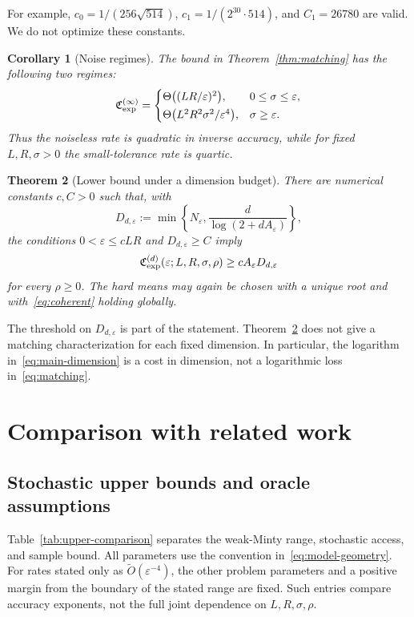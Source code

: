 \documentclass[11pt,a4paper]{article}
\newcommand{\eps}{\varepsilon}
\newcommand{\Cexp}{\mathfrak C_{\rm exp}}
\newtheorem{theorem}{Theorem}[section]
\newtheorem{corollary}[theorem]{Corollary}
\theoremstyle{definition}
\theoremstyle{remark}
\begin{document}
For example, $c_0=1/(256\sqrt{514})$, $c_1=1/(2^{30}\cdot514)$,
and $C_1=26780$ are valid. We do not optimize these constants.

\begin{corollary}[Noise regimes]\label{cor:exponent}
The bound in Theorem~\ref{thm:matching} has the following two regimes:
\[
\Cexp^{(\infty)}=
\begin{cases}
 \Theta\big((LR/\eps)^2\big),&0\le\sigma\le\eps,\\[2pt]
 \Theta\big(L^2R^2\sigma^2/\eps^4\big),&\sigma\ge\eps.
\end{cases}
\]
Thus the noiseless rate is quadratic in inverse accuracy, while for fixed
$L,R,\sigma>0$ the small-tolerance rate is quartic.
\end{corollary}

\begin{theorem}[Lower bound under a dimension budget]\label{thm:dimension}
There are numerical constants $c,C>0$ such that, with
\begin{equation}\label{eq:dimension-scale}
 D_{d,\eps}:=\min\left\{N_\eps,
                 \frac{d}{\log(2+dA_\eps)}\right\},
\end{equation}
the conditions $0<\eps\le cLR$ and $D_{d,\eps}\ge C$ imply
\begin{equation}\label{eq:dimension-frontier}
 \Cexp^{(d)}(\eps;L,R,\sigma,\rho)
 \ge cA_\eps D_{d,\eps}
\end{equation}
for every $\rho\ge0$. The hard means may again be chosen with a unique root
and with~\eqref{eq:coherent} holding globally.
\end{theorem}
The threshold on $D_{d,\eps}$ is part of the statement. Theorem~\ref{thm:dimension}
does not give a matching characterization for each fixed dimension.
In particular, the logarithm in~\eqref{eq:main-dimension} is a cost in
dimension, not a logarithmic loss in~\eqref{eq:matching}.

\section{Comparison with related work}\label{sec:related}

\subsection{Stochastic upper bounds and oracle assumptions}
Table~\ref{tab:upper-comparison} separates the weak-Minty range, stochastic
access, and sample bound. All parameters use the convention
in~\eqref{eq:model-geometry}. For rates stated only as
$\widetilde O(\eps^{-4})$, the other problem parameters and a positive
margin from the boundary of the stated range are fixed. Such entries compare
accuracy exponents, not the full joint dependence on $L,R,\sigma,\rho$.
\end{document}
